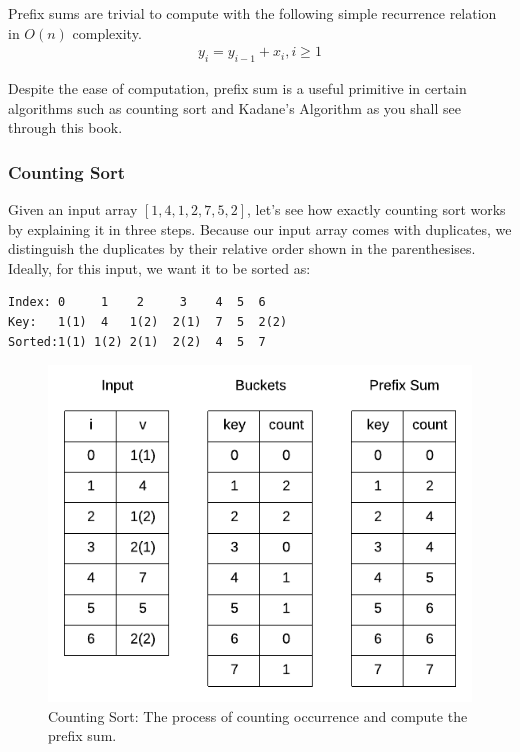 \documentclass[../main.tex]{subfiles}
\begin{document}
Prefix sums are trivial to compute with the following simple recurrence relation  in $O(n)$ complexity. 
\begin{align}
    y_i = y_{i-1} + x_i, i \geq 1
\end{align}

Despite the ease of computation, prefix sum is a useful primitive in certain algorithms such as counting sort and Kadane's Algorithm as you shall see through this book. 

\subsubsection{Counting Sort}
Given an input array $[1, 4, 1, 2, 7, 5, 2]$, let's see how exactly counting sort works by explaining it in three steps. Because our input array comes with duplicates, we distinguish the duplicates by their relative order shown in the parenthesises. Ideally, for this input, we want it to be sorted as:
\begin{lstlisting}[numbers=none]
Index: 0     1    2     3    4  5  6
Key:   1(1)  4   1(2)  2(1)  7  5  2(2)
Sorted:1(1) 1(2) 2(1)  2(2)  4  5  7
\end{lstlisting}
\begin{figure}[!ht]
    \centering

    \includegraphics[width=0.8\columnwidth]{fig/counting_sort_1.png}
    \caption{Counting Sort: The process of counting occurrence and compute the prefix sum.}
        \label{fig:counting_sort_1}
\end{figure}
\end{document}
